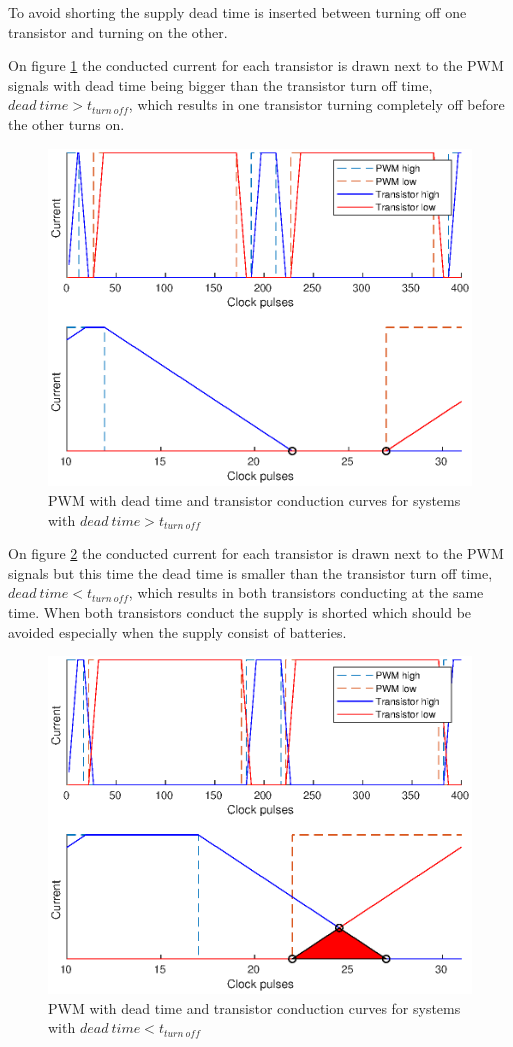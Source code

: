 To avoid shorting the supply dead time is inserted between turning off one transistor and turning on the other.

On figure \ref{fig:turn_off_time1} the conducted current for each transistor is drawn next to the PWM signals with dead time being bigger than the transistor turn off time, $dead \ time > t_{turn \ off}$, which results in one transistor turning completely off before the other turns on. 

\begin{figure}[H]
	\centering
	\includegraphics[width=0.8 \textwidth]{pictures/software/turn_off_time1.eps}
	\caption{PWM with dead time and transistor conduction curves for systems with $dead \ time > t_{turn \ off}$}
	\label{fig:turn_off_time1}
\end{figure}

On figure \ref{fig:turn_off_time2} the conducted current for each transistor is drawn next to the PWM signals but this time the dead time is smaller than the transistor turn off time, $dead \ time < t_{turn \ off}$, which results in both transistors conducting at the same time.
When both transistors conduct the supply is shorted which should be avoided especially when the supply consist of batteries.

\begin{figure}[H]
	\centering
	\includegraphics[width=0.8 \textwidth]{pictures/software/turn_off_time2.eps}
	\caption{PWM with dead time and transistor conduction curves for systems with $dead \ time < t_{turn \ off}$}
	\label{fig:turn_off_time2}
\end{figure}

